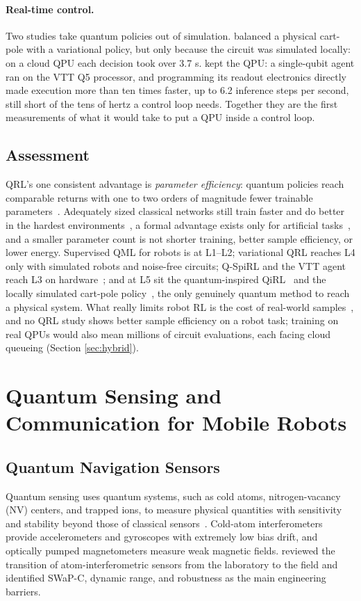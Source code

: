 \documentclass[acmsmall,screen,review]{acmart}
\begin{document}
\paragraph{Real-time control.} Two studies take quantum policies out of simulation. \citet{Sun2025} balanced a physical cart-pole with a variational policy, but only because the circuit was simulated locally: on a cloud QPU each decision took over 3.7 s. \citet{Ngo2026} kept the QPU: a single-qubit agent ran on the VTT Q5 processor, and programming its readout electronics directly made execution more than ten times faster, up to 6.2 inference steps per second, still short of the tens of hertz a control loop needs. Together they are the first measurements of what it would take to put a QPU inside a control loop.

\subsection{Assessment}\label{sec:learning-assessment}
QRL's one consistent advantage is \emph{parameter efficiency}: quantum policies reach comparable returns with one to two orders of magnitude fewer trainable parameters~\cite{Hohenfeld2024,Acuto2022,Dragan2025,Lokossou2025}. Adequately sized classical networks still train faster and do better in the hardest environments~\cite{Hohenfeld2024,Dragan2025}, a formal advantage exists only for artificial tasks~\cite{Jerbi2021}, and a smaller parameter count is not shorter training, better sample efficiency, or lower energy. Supervised QML for robots is at L1--L2; variational QRL reaches L4 only with simulated robots and noise-free circuits; Q-SpiRL and the VTT agent reach L3 on hardware~\cite{Altrabulsi2026,Ngo2026}; and at L5 sit the quantum-inspired QiRL~\cite{Dong2012} and the locally simulated cart-pole policy~\cite{Sun2025}, the only genuinely quantum method to reach a physical system. What really limits robot RL is the cost of real-world samples~\cite{Kober2013}, and no QRL study shows better sample efficiency on a robot task; training on real QPUs would also mean millions of circuit evaluations, each facing cloud queueing (Section \ref{sec:hybrid}).

\section{Quantum Sensing and Communication for Mobile Robots}\label{sec:sensing}

\subsection{Quantum Navigation Sensors}\label{sec:sensors}
Quantum sensing uses quantum systems, such as cold atoms, nitrogen-vacancy (NV) centers, and trapped ions, to measure physical quantities with sensitivity and stability beyond those of classical sensors~\cite{Degen2017}. Cold-atom interferometers provide accelerometers and gyroscopes with extremely low bias drift, and optically pumped magnetometers measure weak magnetic fields. \citet{Bongs2019} reviewed the transition of atom-interferometric sensors from the laboratory to the field and identified SWaP-C, dynamic range, and robustness as the main engineering barriers.
\end{document}
